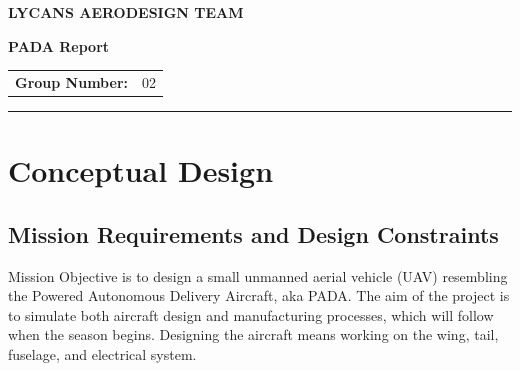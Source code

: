 \documentclass[11pt,a4paper]{article}
\begin{document}

\begin{center}

    {\Large\bfseries\color{LycansBlue}
    LYCANS AERODESIGN TEAM}

    \vspace{0.5cm}

    {\LARGE\bfseries
    PADA Report}

    \vspace{0.5cm}

    \begin{tabular}{rl}
        \textbf{Group Number:} & 02 \\
    \end{tabular}

\end{center}

\vspace{0.5cm}

\hrule

\vspace{0.5cm}


\section{Conceptual Design}
\subsection{Mission Requirements and Design Constraints}
Mission Objective is to design a small unmanned aerial vehicle (UAV) resembling the Powered Autonomous Delivery Aircraft, aka PADA. The aim of the project is to simulate both aircraft design
and manufacturing processes, which will follow when the season begins. Designing the aircraft
means working on the wing, tail, fuselage, and electrical system.
\end{document}
